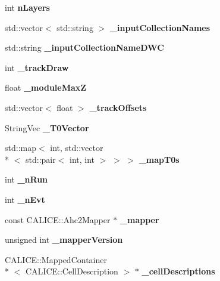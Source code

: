 \begin{DoxyCompactItemize}
\item 
int {\bfseries n\-Layers}\label{classCALICE_1_1DEHEventDisplayProcessor_afb9e4ce990b1aa46d41b9ddbd0ac4334}

\item 
std\-::vector$<$ std\-::string $>$ {\bfseries \-\_\-input\-Collection\-Names}\label{classCALICE_1_1DEHEventDisplayProcessor_a876ee13be41fde039c633d0b95b125b1}

\item 
std\-::string {\bfseries \-\_\-input\-Collection\-Name\-D\-W\-C}\label{classCALICE_1_1DEHEventDisplayProcessor_ab7f37d394e605192982299404553f089}

\item 
int {\bfseries \-\_\-track\-Draw}\label{classCALICE_1_1DEHEventDisplayProcessor_a5d37f26bf9fc8b1797c48d0e966fb795}

\item 
float {\bfseries \-\_\-module\-Max\-Z}\label{classCALICE_1_1DEHEventDisplayProcessor_aef3e2dcfec8f27efa8d8dab1fa07b5e2}

\item 
std\-::vector$<$ float $>$ {\bfseries \-\_\-track\-Offsets}\label{classCALICE_1_1DEHEventDisplayProcessor_a2821ed36ee9cbac64300ae42cd74b1b6}

\item 
String\-Vec {\bf \-\_\-\-T0\-Vector}
\item 
std\-::map$<$ int, std\-::vector\\*
$<$ std\-::pair$<$ int, int $>$ $>$ $>$ {\bf \-\_\-map\-T0s}
\item 
int {\bfseries \-\_\-n\-Run}\label{classCALICE_1_1DEHEventDisplayProcessor_ae190101e05f623eb201892e6e2b4a295}

\item 
int {\bfseries \-\_\-n\-Evt}\label{classCALICE_1_1DEHEventDisplayProcessor_af03c1e1ba652a7a52abf66b7a0cb0b11}

\item 
const C\-A\-L\-I\-C\-E\-::\-Ahc2\-Mapper $\ast$ {\bfseries \-\_\-mapper}\label{classCALICE_1_1DEHEventDisplayProcessor_ab73ecddabf9a09c62b9467945bc37b87}

\item 
unsigned int {\bfseries \-\_\-mapper\-Version}\label{classCALICE_1_1DEHEventDisplayProcessor_a953b0f6038741b2623287ea486c67880}

\item 
C\-A\-L\-I\-C\-E\-::\-Mapped\-Container\\*
$<$ C\-A\-L\-I\-C\-E\-::\-Cell\-Description $>$ $\ast$ {\bfseries \-\_\-cell\-Descriptions}\label{classCALICE_1_1DEHEventDisplayProcessor_a5633bc4a5de6184583c15e6dfa3be325}


\end{DoxyCompactItemize}
